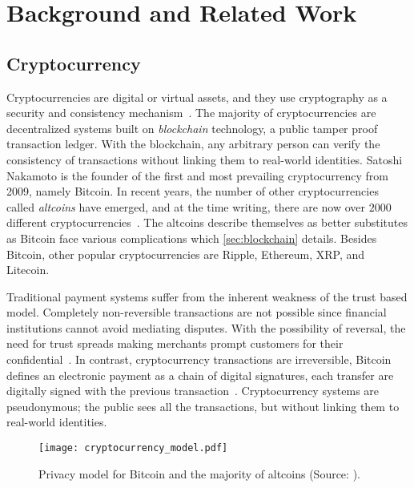 
\chapter{Background and Related Work}\label{ch:background}\glsresetall
\section{Cryptocurrency}\label{sec:cryptocurrencies}
Cryptocurrencies are digital or virtual assets, and they use cryptography as a security and consistency mechanism~\cite{investopedia_cryptocurrency, P&D_to_the_moon}. The majority of cryptocurrencies are decentralized systems built on \emph{blockchain} technology, a public tamper proof transaction ledger. With the blockchain, any arbitrary person can verify the consistency of transactions without linking them to real-world identities. Satoshi Nakamoto is the founder of the first and most prevailing cryptocurrency from 2009, namely Bitcoin. In recent years, the number of other cryptocurrencies called \emph{altcoins} have emerged, and at the time writing, there are now over $2000$ different cryptocurrencies~\cite{coinmarketcap}. The altcoins describe themselves as better substitutes as Bitcoin face various complications which \autoref{sec:blockchain} details. Besides Bitcoin, other popular cryptocurrencies are Ripple, Ethereum, XRP, and Litecoin.

Traditional payment systems suffer from the inherent weakness of the trust based model. Completely non-reversible 
transactions are not possible since financial institutions cannot avoid mediating disputes. With the possibility of reversal, the need for trust spreads making merchants prompt customers for their confidential~\cite{bitcoin}. In contrast, cryptocurrency transactions are irreversible, Bitcoin defines an electronic payment as a chain of digital signatures, each transfer are digitally signed with the previous transaction~\cite{bitcoin, ethereum_white}. Cryptocurrency systems are pseudonymous; the public sees all the transactions, but without linking them to real-world identities.

\begin{figure}[ht]
    \texttt{[image: cryptocurrency\_model.pdf]}
    \caption{Privacy model for Bitcoin and the majority of altcoins (Source: \cite{bitcoin}).}
    \label{fig:cryptocurrency_model}
\end{figure}

